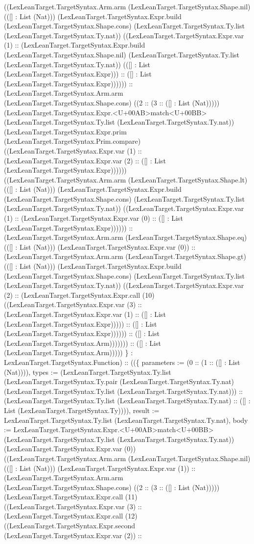 \documentclass[11pt]{article}
\begin{document}
((LexLeanTarget.TargetSyntax.Arm.arm (LexLeanTarget.TargetSyntax.Shape.nil) (([] : List (Nat))) (LexLeanTarget.TargetSyntax.Expr.build (LexLeanTarget.TargetSyntax.Shape.cons) (LexLeanTarget.TargetSyntax.Ty.list (LexLeanTarget.TargetSyntax.Ty.nat)) ((LexLeanTarget.TargetSyntax.Expr.var (1) :: (LexLeanTarget.TargetSyntax.Expr.build (LexLeanTarget.TargetSyntax.Shape.nil) (LexLeanTarget.TargetSyntax.Ty.list (LexLeanTarget.TargetSyntax.Ty.nat)) (([] : List (LexLeanTarget.TargetSyntax.Expr))) :: ([] : List (LexLeanTarget.TargetSyntax.Expr)))))) :: (LexLeanTarget.TargetSyntax.Arm.arm (LexLeanTarget.TargetSyntax.Shape.cons) ((2 :: (3 :: ([] : List (Nat))))) (LexLeanTarget.TargetSyntax.Expr.<U+00AB>match<U+00BB> (LexLeanTarget.TargetSyntax.Ty.list (LexLeanTarget.TargetSyntax.Ty.nat)) (LexLeanTarget.TargetSyntax.Expr.prim (LexLeanTarget.TargetSyntax.Prim.compare) ((LexLeanTarget.TargetSyntax.Expr.var (1) :: (LexLeanTarget.TargetSyntax.Expr.var (2) :: ([] : List (LexLeanTarget.TargetSyntax.Expr)))))) ((LexLeanTarget.TargetSyntax.Arm.arm (LexLeanTarget.TargetSyntax.Shape.lt) (([] : List (Nat))) (LexLeanTarget.TargetSyntax.Expr.build (LexLeanTarget.TargetSyntax.Shape.cons) (LexLeanTarget.TargetSyntax.Ty.list (LexLeanTarget.TargetSyntax.Ty.nat)) ((LexLeanTarget.TargetSyntax.Expr.var (1) :: (LexLeanTarget.TargetSyntax.Expr.var (0) :: ([] : List (LexLeanTarget.TargetSyntax.Expr)))))) :: (LexLeanTarget.TargetSyntax.Arm.arm (LexLeanTarget.TargetSyntax.Shape.eq) (([] : List (Nat))) (LexLeanTarget.TargetSyntax.Expr.var (0)) :: (LexLeanTarget.TargetSyntax.Arm.arm (LexLeanTarget.TargetSyntax.Shape.gt) (([] : List (Nat))) (LexLeanTarget.TargetSyntax.Expr.build (LexLeanTarget.TargetSyntax.Shape.cons) (LexLeanTarget.TargetSyntax.Ty.list (LexLeanTarget.TargetSyntax.Ty.nat)) ((LexLeanTarget.TargetSyntax.Expr.var (2) :: (LexLeanTarget.TargetSyntax.Expr.call (10) ((LexLeanTarget.TargetSyntax.Expr.var (3) :: (LexLeanTarget.TargetSyntax.Expr.var (1) :: ([] : List (LexLeanTarget.TargetSyntax.Expr))))) :: ([] : List (LexLeanTarget.TargetSyntax.Expr)))))) :: ([] : List (LexLeanTarget.TargetSyntax.Arm))))))) :: ([] : List (LexLeanTarget.TargetSyntax.Arm))))) \} : LexLeanTarget.TargetSyntax.Function) :: ((\{ parameters := (0 :: (1 :: ([] : List (Nat)))), types := (LexLeanTarget.TargetSyntax.Ty.list (LexLeanTarget.TargetSyntax.Ty.pair (LexLeanTarget.TargetSyntax.Ty.nat) (LexLeanTarget.TargetSyntax.Ty.list (LexLeanTarget.TargetSyntax.Ty.nat))) :: (LexLeanTarget.TargetSyntax.Ty.list (LexLeanTarget.TargetSyntax.Ty.nat) :: ([] : List (LexLeanTarget.TargetSyntax.Ty)))), result := LexLeanTarget.TargetSyntax.Ty.list (LexLeanTarget.TargetSyntax.Ty.nat), body := LexLeanTarget.TargetSyntax.Expr.<U+00AB>match<U+00BB> (LexLeanTarget.TargetSyntax.Ty.list (LexLeanTarget.TargetSyntax.Ty.nat)) (LexLeanTarget.TargetSyntax.Expr.var (0)) ((LexLeanTarget.TargetSyntax.Arm.arm (LexLeanTarget.TargetSyntax.Shape.nil) (([] : List (Nat))) (LexLeanTarget.TargetSyntax.Expr.var (1)) :: (LexLeanTarget.TargetSyntax.Arm.arm (LexLeanTarget.TargetSyntax.Shape.cons) ((2 :: (3 :: ([] : List (Nat))))) (LexLeanTarget.TargetSyntax.Expr.call (11) ((LexLeanTarget.TargetSyntax.Expr.var (3) :: (LexLeanTarget.TargetSyntax.Expr.call (12) ((LexLeanTarget.TargetSyntax.Expr.second (LexLeanTarget.TargetSyntax.Expr.var (2)) :: 
\end{document}
